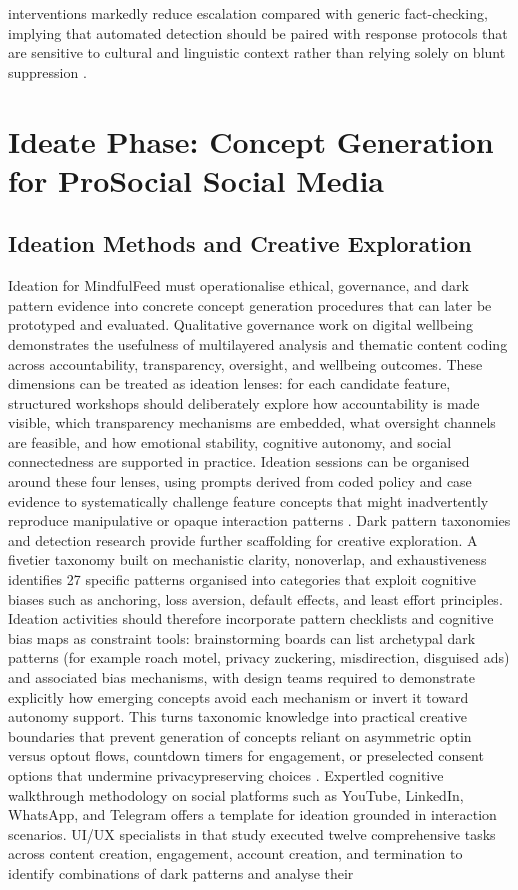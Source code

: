 \documentclass{article}
\begin{document}
interventions markedly reduce escalation compared with generic fact-checking, implying that automated detection should be paired with response protocols that are sensitive to cultural and linguistic context rather than relying solely on blunt suppression \parencites[11]{8597215}.

\section{Ideate Phase: Concept Generation for Pro\-Social Social Media}

\subsection{Ideation Methods and Creative Exploration}
\label{sec:ideation_methods_creative_exploration} Ideation for MindfulFeed must operationalise ethical, governance, and dark pattern evidence into concrete concept generation procedures that can later be prototyped and evaluated. Qualitative governance work on digital well\-being demonstrates the usefulness of multi\-layered analysis and thematic content coding across accountability, transparency, oversight, and well\-being outcomes. These dimensions can be treated as ideation lenses: for each candidate feature, structured workshops should deliberately explore how accountability is made visible, which transparency mechanisms are embedded, what oversight channels are feasible, and how emotional stability, cognitive autonomy, and social connectedness are supported in practice. Ideation sessions can be organised around these four lenses, using prompts derived from coded policy and case evidence to systematically challenge feature concepts that might inadvertently reproduce manipulative or opaque interaction patterns \parencites[7]{7808872}[8]{7808872}. Dark pattern taxonomies and detection research provide further scaffolding for creative exploration. A five\-tier taxonomy built on mechanistic clarity, non\-overlap, and exhaustiveness identifies 27 specific patterns organised into categories that exploit cognitive biases such as anchoring, loss aversion, default effects, and least effort principles. Ideation activities should therefore incorporate pattern checklists and cognitive bias maps as constraint tools: brainstorming boards can list archetypal dark patterns (for example roach motel, privacy zuckering, misdirection, disguised ads) and associated bias mechanisms, with design teams required to demonstrate explicitly how emerging concepts avoid each mechanism or invert it toward autonomy support. This turns taxonomic knowledge into practical creative boundaries that prevent generation of concepts reliant on asymmetric opt\-in versus opt\-out flows, countdown timers for engagement, or preselected consent options that undermine privacy\-preserving choices \parencites[2]{4807303}. Expert\-led cognitive walkthrough methodology on social platforms such as YouTube, LinkedIn, WhatsApp, and Telegram offers a template for ideation grounded in interaction scenarios. UI/UX specialists in that study executed twelve comprehensive tasks across content creation, engagement, account creation, and termination to identify combinations of dark patterns and analyse their 
\end{document}
